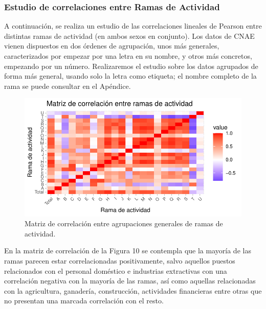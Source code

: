 \documentclass[Universitat de
València,article,submit,moreauthors,pdftex]{Definitions/mdpi}
\begin{document}
\subsubsection{\texorpdfstring{\textbf{Estudio de correlaciones entre
Ramas de
Actividad}}{Estudio de correlaciones entre Ramas de Actividad}}\label{estudio-de-correlaciones-entre-ramas-de-actividad}

A continuación, se realiza un estudio de las correlaciones lineales de
Pearson entre distintas ramas de actividad (en ambos sexos en conjunto).
Los datos de CNAE vienen dispuestos en dos órdenes de agrupación, unos
más generales, caracterizados por empezar por una letra en su nombre, y
otros más concretos, empezando por un número. Realizaremos el estudio
sobre los datos agrupados de forma más general, usando solo la letra
como etiqueta; el nombre completo de la rama se puede consultar en el
Apéndice.

\begin{figure}

{\centering \includegraphics{ProyectoAED2024_files/figure-latex/unnamed-chunk-40-1} 

}

\caption{Matriz de correlación entre agrupaciones generales de ramas de actividad.}\label{fig:unnamed-chunk-40}
\end{figure}

En la matriz de correlación de la Figura 10 se contempla que la mayoría
de las ramas parecen estar correlacionadas positivamente, salvo aquellos
puestos relacionados con el personal doméstico e industrias extractivas
con una correlación negativa con la mayoría de las ramas, así como
aquellas relacionadas con la agricultura, ganadería, construcción,
actividades financieras entre otras que no presentan una marcada
correlación con el resto.
\end{document}
